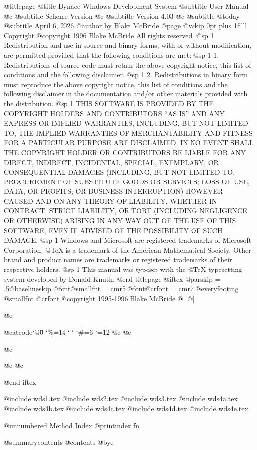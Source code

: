 @titlepage
@title Dynace Windows Development System
@subtitle User Manual
@c @subtitle Scheme Version
@c @subtitle Version 4.03
@c @subtitle @today{}
@subtitle April 6, 2026
@author by Blake McBride
@page
@vskip 0pt plus 1filll
Copyright  @copyright{} 1996 Blake McBride
All rights reserved.
@sp 1
Redistribution and use in source and binary forms, with or without
modification, are permitted provided that the following conditions are
met:
@sp 1
1. Redistributions of source code must retain the above copyright
notice, this list of conditions and the following disclaimer.
@sp 1
2. Redistributions in binary form must reproduce the above copyright
notice, this list of conditions and the following disclaimer in the
documentation and/or other materials provided with the distribution.
@sp 1
THIS SOFTWARE IS PROVIDED BY THE COPYRIGHT HOLDERS AND CONTRIBUTORS
``AS IS'' AND ANY EXPRESS OR IMPLIED WARRANTIES, INCLUDING, BUT NOT
LIMITED TO, THE IMPLIED WARRANTIES OF MERCHANTABILITY AND FITNESS FOR
A PARTICULAR PURPOSE ARE DISCLAIMED. IN NO EVENT SHALL THE COPYRIGHT
HOLDER OR CONTRIBUTORS BE LIABLE FOR ANY DIRECT, INDIRECT, INCIDENTAL,
SPECIAL, EXEMPLARY, OR CONSEQUENTIAL DAMAGES (INCLUDING, BUT NOT
LIMITED TO, PROCUREMENT OF SUBSTITUTE GOODS OR SERVICES; LOSS OF USE,
DATA, OR PROFITS; OR BUSINESS INTERRUPTION) HOWEVER CAUSED AND ON ANY
THEORY OF LIABILITY, WHETHER IN CONTRACT, STRICT LIABILITY, OR TORT
(INCLUDING NEGLIGENCE OR OTHERWISE) ARISING IN ANY WAY OUT OF THE USE
OF THIS SOFTWARE, EVEN IF ADVISED OF THE POSSIBILITY OF SUCH DAMAGE.
@sp 1
Windows and Microsoft are registered trademarks of
Microsoft Corporation.  @TeX{} is a trademark of the American
Mathematical Society. Other brand and product names are trademarks or
registered trademarks of their respective holders.
@sp 1
This manual was typeset with the @TeX{} typesetting system developed by
Donald Knuth.
@end titlepage
@iftex
@parskip = .5@baselineskip
@font@smallfnt = cmr5
@font@crfont = cmr7
@everyfooting {@smallfnt {@crfont @copyright{}} 1995-1996 Blake McBride} @| @|

@c {@catcode`@\=0 \catcode`\%=14 \catcode` \catcode` \catcode `\#=6 \catcode `\@=12
@c 
@c 
@c 
@c %
@c }

@end iftex



@include wds1.tex
@include wds2.tex
@include wds3.tex
@include wds4a.tex
@include wds4b.tex
@include wds4c.tex
@include wds4d.tex
@include wds4e.tex


@unnumbered Method Index
@printindex fn

@summarycontents
@contents
@bye


